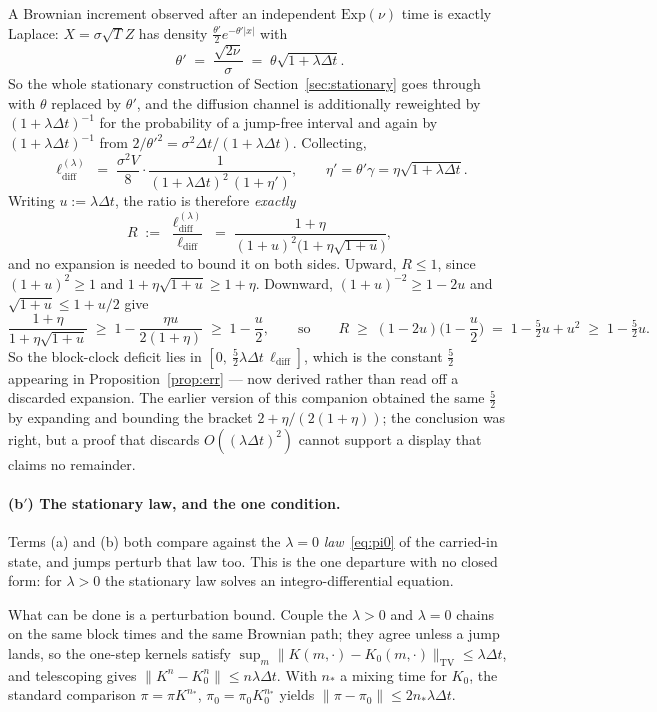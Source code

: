 \documentclass[11pt]{article}
\theoremstyle{definition}
\theoremstyle{remark}
\newcommand{\dt}{\Delta t}
\newcommand{\1}{\mathbf{1}}
\begin{document}
A Brownian increment observed after an independent $\mathrm{Exp}(\nu)$ time is exactly Laplace: $X = \sigma\sqrt{T}Z$ has density $\tfrac{\theta'}{2}e^{-\theta'|x|}$ with
\[
\theta' \;=\; \frac{\sqrt{2\nu}}{\sigma} \;=\; \theta\sqrt{1+\lambda\dt}.
\]
So the whole stationary construction of Section~\ref{sec:stationary} goes through with $\theta$ replaced by $\theta'$, and the diffusion channel is additionally reweighted by $(1+\lambda\dt)^{-1}$ for the probability of a jump-free interval and again by $(1+\lambda\dt)^{-1}$ from $2/\theta'^2 = \sigma^2\dt/(1+\lambda\dt)$. Collecting,
\[
\ell_{\mathrm{diff}}^{(\lambda)} \;=\; \frac{\sigma^2V}{8}\cdot\frac{1}{(1+\lambda\dt)^2\,(1+\eta')},
\qquad \eta' = \theta'\gamma = \eta\sqrt{1+\lambda\dt}.
\]
Writing $u := \lambda\dt$, the ratio is therefore \emph{exactly}
\[
R \;:=\; \frac{\ell_{\mathrm{diff}}^{(\lambda)}}{\ell_{\mathrm{diff}}} \;=\; \frac{1+\eta}{(1+u)^2\big(1+\eta\sqrt{1+u}\big)} ,
\]
and no expansion is needed to bound it on both sides. Upward, $R\le1$, since $(1+u)^2\ge1$ and $1+\eta\sqrt{1+u}\ge1+\eta$. Downward, $(1+u)^{-2}\ge1-2u$ and $\sqrt{1+u}\le1+u/2$ give
\[
\frac{1+\eta}{1+\eta\sqrt{1+u}} \;\ge\; 1-\frac{\eta u}{2(1+\eta)} \;\ge\; 1-\frac{u}{2},
\qquad\text{so}\qquad R \;\ge\; (1-2u)\Big(1-\frac u2\Big) \;=\; 1-\tfrac52u+u^2 \;\ge\; 1-\tfrac52 u .
\]
So the block-clock deficit lies in $[0,\ \tfrac52\lambda\dt\,\ell_{\mathrm{diff}}]$, which is the constant $\tfrac52$ appearing in Proposition~\ref{prop:err} --- now derived rather than read off a discarded expansion. The earlier version of this companion obtained the same $\tfrac52$ by expanding and bounding the bracket $2+\eta/(2(1+\eta))$; the conclusion was right, but a proof that discards $O((\lambda\dt)^2)$ cannot support a display that claims no remainder.

\paragraph{(b$'$) The stationary law, and the one condition.}
Terms (a) and (b) both compare against the $\lambda=0$ \emph{law}~\eqref{eq:pi0} of the carried-in state, and jumps perturb that law too. This is the one departure with no closed form: for $\lambda>0$ the stationary law solves an integro-differential equation.

What can be done is a perturbation bound. Couple the $\lambda>0$ and $\lambda=0$ chains on the same block times and the same Brownian path; they agree unless a jump lands, so the one-step kernels satisfy $\sup_m\|K(m,\cdot)-K_0(m,\cdot)\|_{\mathrm{TV}}\le\lambda\dt$, and telescoping gives $\|K^n-K_0^n\|\le n\lambda\dt$. With $n_*$ a mixing time for $K_0$, the standard comparison $\pi=\pi K^{n_*}$, $\pi_0=\pi_0K_0^{n_*}$ yields $\|\pi-\pi_0\|\le 2n_*\lambda\dt$.
\end{document}
